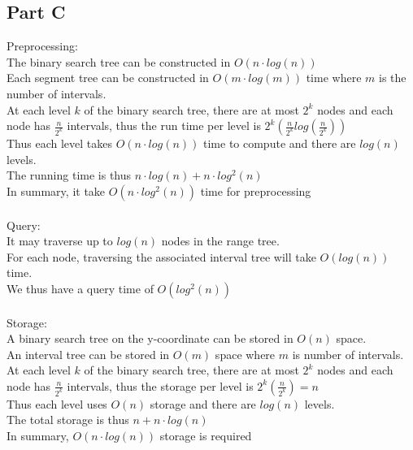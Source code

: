 \documentclass[11pt,psfig]{article}
\begin{document}
\newpage

\subsection*{Part C}

Preprocessing: \\
The binary search tree can be constructed in $O(n \cdot log(n))$\\
Each segment tree can be constructed in $O(m \cdot log(m))$ time where $m$ is the number of intervals. \\
At each level $k$ of the binary search tree, there are at most $2^k$ nodes and each node has $\frac{n}{2^k}$ intervals, thus the run time per level is $2^k(\frac{n}{2^k} log(\frac{n}{2^k}))$\\
Thus each level takes $O(n \cdot log(n))$ time to compute and there are $log(n)$ levels. \\
The running time is thus $n \cdot log(n) + n \cdot log^2(n)$\\
In summary, it take $O(n \cdot log^2(n))$ time for preprocessing  \\
\\
Query: \\
It may traverse up to $log(n)$ nodes in the range tree. \\
For each node, traversing the associated interval tree will take $O(log(n))$ time. \\
We thus have a query time of $O(log^2(n))$\\
\\
Storage:\\
A binary search tree on the y-coordinate can be stored in $O(n)$ space. \\
An interval tree can be stored in $O(m)$ space where $m$ is number of intervals. \\
At each level $k$ of the binary search tree, there are at most $2^k$ nodes and each node has $\frac{n}{2^k}$ intervals, thus the storage per level is $2^k(\frac{n}{2^k})=n$\\
Thus each level uses $O(n)$ storage and there are $log(n)$ levels. \\
The total storage is thus $n + n \cdot log(n)$\\
In summary, $O(n \cdot log(n))$ storage is required

\newpage
\end{document}
